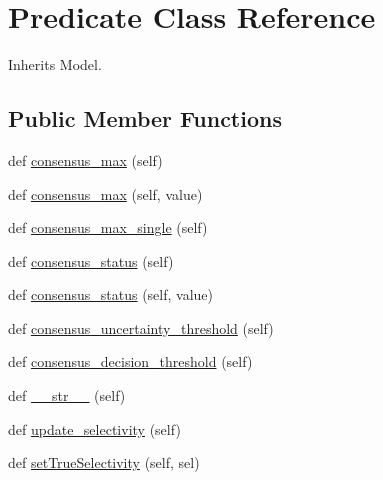 \hypertarget{classdynamicfilterapp_1_1models_1_1_predicate}{}\section{Predicate Class Reference}
\label{classdynamicfilterapp_1_1models_1_1_predicate}


Inherits Model.

\subsection*{Public Member Functions}
\begin{DoxyCompactItemize}
\item 
def \mbox{\hyperlink{classdynamicfilterapp_1_1models_1_1_predicate_a041df75dd2354ebd0b4802adfc96993e}{consensus\+\_\+max}} (self)
\item 
def \mbox{\hyperlink{classdynamicfilterapp_1_1models_1_1_predicate_ad8419218db77659995b89d783709d0f5}{consensus\+\_\+max}} (self, value)
\item 
def \mbox{\hyperlink{classdynamicfilterapp_1_1models_1_1_predicate_abcab4ef70d7f8b63e70922755fa2daf8}{consensus\+\_\+max\+\_\+single}} (self)
\item 
def \mbox{\hyperlink{classdynamicfilterapp_1_1models_1_1_predicate_aa052e06571748727ad162068d955009b}{consensus\+\_\+status}} (self)
\item 
def \mbox{\hyperlink{classdynamicfilterapp_1_1models_1_1_predicate_a17886248032e85320808da26e5254fff}{consensus\+\_\+status}} (self, value)
\item 
def \mbox{\hyperlink{classdynamicfilterapp_1_1models_1_1_predicate_abb47f59cdc395b26b76297491b95d603}{consensus\+\_\+uncertainty\+\_\+threshold}} (self)
\item 
def \mbox{\hyperlink{classdynamicfilterapp_1_1models_1_1_predicate_abeb36f0601037cc6f8066fdb9dea2cc3}{consensus\+\_\+decision\+\_\+threshold}} (self)
\item 
def \mbox{\hyperlink{classdynamicfilterapp_1_1models_1_1_predicate_a23e8041ce1015febe4fdace3225714f9}{\+\_\+\+\_\+str\+\_\+\+\_\+}} (self)
\item 
def \mbox{\hyperlink{classdynamicfilterapp_1_1models_1_1_predicate_a20d11566ab0f56ccf8baac7a18809185}{update\+\_\+selectivity}} (self)
\item 
def \mbox{\hyperlink{classdynamicfilterapp_1_1models_1_1_predicate_a846159dde6bc49c65012e40cf2643958}{set\+True\+Selectivity}} (self, sel)
\item 

\end{DoxyCompactItemize}

